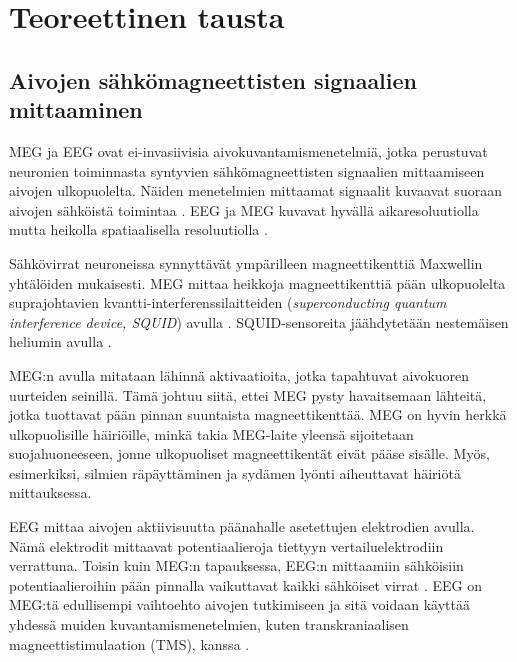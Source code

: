 \section{Teoreettinen tausta}



\subsection{Aivojen sähkömagneettisten signaalien mittaaminen}

MEG ja EEG ovat ei-invasiivisia aivokuvantamismenetelmiä, jotka perustuvat neuronien toiminnasta syntyvien sähkömagneettisten signaalien mittaamiseen aivojen ulkopuolelta. Näiden menetelmien mittaamat signaalit kuvaavat suoraan aivojen sähköistä toimintaa \citep{Baillet2001ElectromagneticMapping}. EEG ja MEG kuvavat hyvällä aikaresoluutiolla mutta heikolla spatiaalisella resoluutiolla \citep{He2018ElectrophysiologicalDynamics}.

Sähkövirrat neuroneissa synnyttävät ympärilleen magneettikenttiä Maxwellin yhtälöiden mukaisesti. MEG mittaa heikkoja magneettikenttiä pään ulkopuolelta suprajohtavien kvantti-interferenssilaitteiden (\textit{superconducting quantum interference device, SQUID}) avulla \citep{Hamalainen1993MagnetoencephalographytheoryBrain}. SQUID-sensoreita jäähdytetään nestemäisen heliumin avulla \citep[s. 6]{hansen2010meg}. 

MEG:n avulla mitataan lähinnä aktivaatioita, jotka tapahtuvat aivokuoren uurteiden seinillä. Tämä johtuu siitä, ettei MEG pysty havaitsemaan lähteitä, jotka tuottavat pään pinnan suuntaista magneettikenttää. \citep{hansen2010meg} MEG on hyvin herkkä ulkopuolisille häiriöille, minkä takia MEG-laite yleensä sijoitetaan suojahuoneeseen, jonne ulkopuoliset magneettikentät eivät pääse sisälle. Myös, esimerkiksi, silmien räpäyttäminen ja sydämen lyönti aiheuttavat häiriötä mittauksessa. \citep{Hamalainen1993MagnetoencephalographytheoryBrain}

EEG mittaa aivojen aktiivisuutta päänahalle asetettujen elektrodien avulla. Nämä elektrodit mittaavat potentiaalieroja tiettyyn vertailuelektrodiin verrattuna. \citep{Michel2004EEGImaging} Toisin kuin MEG:n tapauksessa, EEG:n mittaamiin sähköisiin potentiaalieroihin pään pinnalla vaikuttavat kaikki sähköiset virrat \citep{HariMEGprimer}. EEG on MEG:tä edullisempi vaihtoehto aivojen tutkimiseen ja sitä voidaan käyttää yhdessä muiden kuvantamismenetelmien, kuten transkraniaalisen magneettistimulaation (TMS), kanssa \citep[s. 11]{HariMEGprimer}. 


